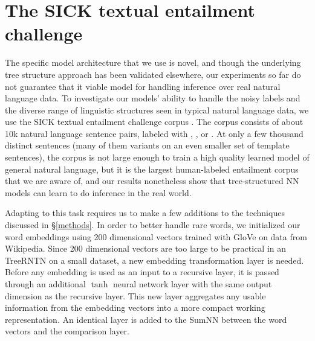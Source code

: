 \section{The SICK textual entailment challenge}\label{sec:sick}



The specific model architecture that we use is novel, and though the underlying tree structure approach has been validated elsewhere, our experiments so far do not guarantee that it viable model for handling inference over real
natural language data. To investigate our models' ability to handle the noisy labels and the diverse range of linguistic structures seen in typical natural language data, we use the SICK textual entailment challenge corpus \cite{marelli2014sick}. The corpus consists of about 10k natural language sentence pairs, labeled with , , or . At only a few thousand distinct sentences (many of them variants on an even smaller set of template sentences), the corpus is not large enough to train a high quality learned model of general natural language, but it is the largest human-labeled entailment corpus that we are aware of, and our results nonetheless show that tree-structured NN models can learn to do inference in the real world.

Adapting to this task requires us to make a few additions to the techniques discussed in \S\ref{methods}. In order to better handle rare words, we initialized our word embeddings using 200 dimensional vectors trained with 
GloVe \cite{pennington2014glove} on data from Wikipedia. Since 200 dimensional vectors are too large to be practical in an TreeRNTN on a small dataset, a new embedding transformation layer is needed. Before any embedding is used as an input to a recursive layer, it is passed through an additional $\tanh$ neural network layer with the same output dimension as the recursive layer. This new layer aggregates any usable information from the embedding vectors into a more compact working representation. An identical layer is added to the SumNN between the word vectors and the comparison layer.

